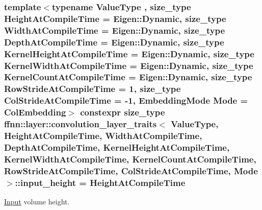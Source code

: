 \hypertarget{structffnn_1_1layer_1_1convolution__layer__traits_a94cdb215d2fa97936542f44551bea669}{
\subsubsection[{input\-\_\-height}]{\setlength{\rightskip}{0pt plus 5cm}template$<$typename Value\-Type , size\-\_\-type Height\-At\-Compile\-Time = Eigen\-::\-Dynamic, size\-\_\-type Width\-At\-Compile\-Time = Eigen\-::\-Dynamic, size\-\_\-type Depth\-At\-Compile\-Time = Eigen\-::\-Dynamic, size\-\_\-type Kernel\-Height\-At\-Compile\-Time = Eigen\-::\-Dynamic, size\-\_\-type Kernel\-Width\-At\-Compile\-Time = Eigen\-::\-Dynamic, size\-\_\-type Kernel\-Count\-At\-Compile\-Time = Eigen\-::\-Dynamic, size\-\_\-type Row\-Stride\-At\-Compile\-Time = 1, size\-\_\-type Col\-Stride\-At\-Compile\-Time = -\/1, Embedding\-Mode Mode = Col\-Embedding$>$ constexpr {\bf size\-\_\-type} {\bf ffnn\-::layer\-::convolution\-\_\-layer\-\_\-traits}$<$ Value\-Type, Height\-At\-Compile\-Time, Width\-At\-Compile\-Time, Depth\-At\-Compile\-Time, Kernel\-Height\-At\-Compile\-Time, Kernel\-Width\-At\-Compile\-Time, Kernel\-Count\-At\-Compile\-Time, Row\-Stride\-At\-Compile\-Time, Col\-Stride\-At\-Compile\-Time, Mode $>$\-::input\-\_\-height = Height\-At\-Compile\-Time\hspace{0.3cm}{\ttfamily [static]}}}\label{structffnn_1_1layer_1_1convolution__layer__traits_a94cdb215d2fa97936542f44551bea669}


\hyperlink{classffnn_1_1layer_1_1_input}{Input} volume height. 

